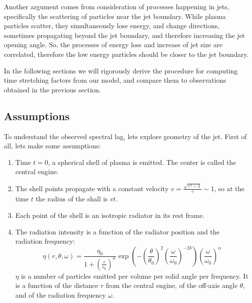 \documentclass{article}
\begin{document}
Another argument comes from consideration of processes happening in jets, specifically the scattering of particles near the jet boundary.
While plasma particles scatter, they simultaneously lose energy, and change directions, sometimes propagating beyond the jet boundary, and therefore increasing the jet opening angle.
So, the processes of energy loss and increase of jet size are correlated, therefore the low energy particles should be closer to the jet boundary.

In the following sections we will rigorously derive the procedure for computing time stretching factors from our model, and compare them to observations obtained in the previous section.

\subsection{Assumptions}

To understand the observed spectral lag, lets explore geometry of the jet. First of all, lets make some assumptions:
\begin{enumerate}
\item{Time $t = 0$, a spherical shell of plasma is emitted. The center is called the central engine.}
\item{The shell points propagate with a constant velocity $v = \frac{\sqrt{\gamma^2 - 1}}{\gamma} \sim 1$, so at the time $t$ the radius of the shall is $v t$.}
\item{Each point of the shell is an isotropic radiator in its rest frame.}
\item{
	The radiation intensity is a function of the radiator position and the radiation frequency:
	\begin{equation}
		\eta\left(r,\theta,\omega\right) = 
		\frac{\eta_0}{1 + \left(\frac{r}{r_0}\right)^n}
		\exp\left(
			-\left(\frac{\theta}{\theta_0}\right)^2
			\left(\frac{\omega}{\omega_0}\right)^{-2k}
		\right)
		\left(\frac{\omega}{\omega_0}\right)^\alpha
	\end{equation}
	$\eta$ is a number of particles emitted per volume per solid angle per frequency. It is a function of the distance $r$ from the central engine, of the off-axis angle $\theta$, and of the radiation frequency $\omega$.
}
\end{enumerate}
\end{document}
